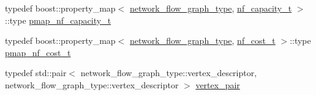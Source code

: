 \begin{DoxyCompactItemize}
typedef boost\+::property\+\_\+map$<$ \hyperlink{classnetwork__flow_abfdb8d1baba183c2b121f8c078b9b640}{network\+\_\+flow\+\_\+graph\+\_\+type}, \hyperlink{structnetwork__flow_1_1nf__capacity__t}{nf\+\_\+capacity\+\_\+t} $>$\+::type \hyperlink{classnetwork__flow_a234594983ab43e779b43424c829cdcca}{pmap\+\_\+nf\+\_\+capacity\+\_\+t}
\item 
typedef boost\+::property\+\_\+map$<$ \hyperlink{classnetwork__flow_abfdb8d1baba183c2b121f8c078b9b640}{network\+\_\+flow\+\_\+graph\+\_\+type}, \hyperlink{structnetwork__flow_1_1nf__cost__t}{nf\+\_\+cost\+\_\+t} $>$\+::type \hyperlink{classnetwork__flow_ab3d76d6bf04d076c74f5f51cc55f621e}{pmap\+\_\+nf\+\_\+cost\+\_\+t}
\item 
typedef std\+::pair$<$ network\+\_\+flow\+\_\+graph\+\_\+type\+::vertex\+\_\+descriptor, network\+\_\+flow\+\_\+graph\+\_\+type\+::vertex\+\_\+descriptor $>$ \hyperlink{classnetwork__flow_a7a59f52da10f126268707c9097a37442}{vertex\+\_\+pair}
\end{DoxyCompactItemize}
